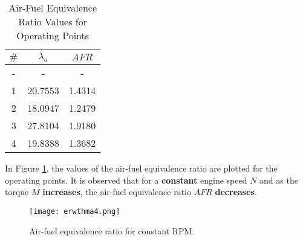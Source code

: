 \documentclass{report}
\begin{document}
\begin{table}[h]
    \centering
    \renewcommand{\arraystretch}{1.2} 
    \begin{tabular}{|c|c|c|}
    \hline
    \rowcolor{blue}
    $\#$ & $\lambda_a$ & $AFR$\\
    \hline
    \rowcolor{gray}
    - & - & -\\
    \hline
    1 & 20.7553 & 1.4314\\
    \hline
    2 & 18.0947 & 1.2479\\
    \hline
    3 & 27.8104 & 1.9180\\
    \hline
    4 & 19.8388 & 1.3682\\
    \hline 
    \end{tabular}
    \caption{Air-Fuel Equivalence Ratio Values for Operating Points}
    \label{tab:AFR}
\end{table}

In Figure \ref{fig:AFR}, the values of the air-fuel equivalence ratio are plotted for the operating points. It is observed that for a \textbf{constant} engine speed $N$ and as the torque $M$ \textbf{increases}, the air-fuel equivalence ratio $AFR$ \textbf{decreases}.

\begin{figure}[h]\centering\texttt{[image: erwthma4.png]}\caption{Air-fuel equivalence ratio for constant RPM.}\label{fig:AFR}\end{figure}
\end{document}
